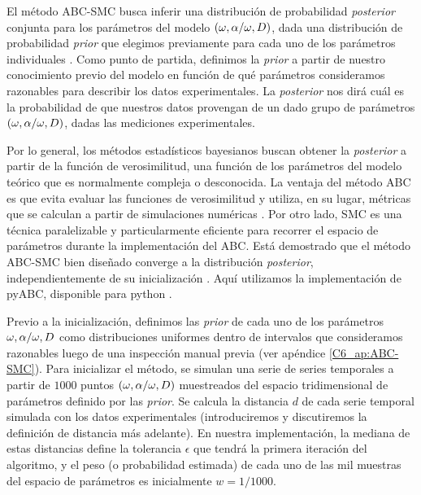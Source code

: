 \documentclass[./main.tex]{subfiles}
\begin{document}


El método ABC-SMC busca inferir una distribución de probabilidad \textit{posterior} conjunta para los parámetros del modelo $(\omega,\alpha/\omega,D)$, dada una distribución de probabilidad \textit{prior} que elegimos previamente para cada uno de los parámetros individuales \cite{Toni2009}. Como punto de partida, definimos la \textit{prior} a partir de nuestro conocimiento previo del modelo en función de qué parámetros consideramos razonables para describir los datos experimentales. La \textit{posterior} nos dirá cuál es la probabilidad de que nuestros datos provengan de un dado grupo de parámetros $(\omega,\alpha/\omega,D)$, dadas las mediciones experimentales.


Por lo general, los métodos estadísticos bayesianos buscan obtener la \textit{posterior} a partir de la función de verosimilitud, una función de los parámetros del modelo teórico que es normalmente compleja o desconocida. La ventaja del método ABC es que evita evaluar las funciones de verosimilitud y utiliza, en su lugar, métricas que se calculan a partir de simulaciones numéricas \cite{Csillery2010}. Por otro lado, SMC es una técnica paralelizable y particularmente eficiente para recorrer el espacio de parámetros durante la implementación del ABC. Está demostrado que el método ABC-SMC bien diseñado converge a la distribución \textit{posterior}, independientemente de su inicialización \cite{Csillery2010,Filippi2013}. Aquí utilizamos la implementación de pyABC, disponible para python \cite{Klinger2018}.


Previo a la inicialización, definimos las \textit{prior} de cada uno de los parámetros $\omega,\alpha/\omega,D$ como distribuciones uniformes dentro de intervalos que consideramos razonables luego de una inspección manual previa \cite{Toni2010} (ver apéndice \ref{C6_ap:ABC-SMC}). Para inicializar el método, se simulan una serie de series temporales a partir de $1000$ puntos $(\omega,\alpha/\omega,D)$ muestreados del espacio tridimensional de parámetros definido por las \textit{prior}. Se calcula la distancia $d$ de cada serie temporal simulada con los datos experimentales (introduciremos y discutiremos la definición de distancia más adelante). En nuestra implementación, la mediana de estas distancias define la tolerancia $\epsilon$ que tendrá la primera iteración del algoritmo, y el peso (o probabilidad estimada) de cada uno de las mil muestras del espacio de parámetros es inicialmente $w = 1/1000$. 
\end{document}
